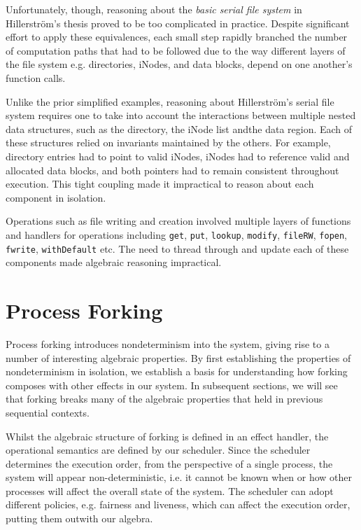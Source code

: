 \documentclass[logo,bsc,singlespacing,parskip]{infthesis}
\begin{document}
Unfortunately, though, reasoning about the \textit{basic serial file system} in Hillerström's thesis proved to be too complicated in practice. Despite significant effort to apply these equivalences, each small step  rapidly branched the number of computation paths that had to be followed due to the way different layers of the file system e.g. directories, iNodes, and data blocks, depend on one another's function calls. 

Unlike the prior simplified examples, reasoning about Hillerström's serial file system requires one to take into account the interactions between multiple nested data structures, such as the directory, the iNode list andthe data region. Each of these structures relied on invariants maintained by the others. For example, directory entries had to point to valid iNodes, iNodes had to reference valid and allocated data blocks, and both pointers had to remain consistent throughout execution. This tight coupling made it impractical to reason about each component in isolation.

Operations such as file writing and creation involved multiple layers of functions and handlers for operations including \lstinline{get}, \lstinline{put}, \lstinline{lookup}, \lstinline{modify}, \lstinline{fileRW}, \lstinline{fopen}, \lstinline{fwrite}, \lstinline{withDefault} etc. The need to thread through and update each of these components made algebraic reasoning impractical.


\section{Process Forking}

Process forking introduces nondeterminism into the system, giving rise to a number of interesting algebraic properties. By first establishing the properties of nondeterminism in isolation, we establish a basis for understanding how forking composes with other effects in our system. In subsequent sections, we will see that forking breaks many of the algebraic properties that held in previous sequential contexts.

Whilst the algebraic structure of forking is defined in an effect handler, the operational semantics are defined by our scheduler. Since the scheduler determines the execution order, from the perspective of a single process, the system will appear non-deterministic, i.e. it cannot be known when or how other processes will affect the overall state of the system. The scheduler can adopt different policies, e.g. fairness and liveness, which can affect the execution order, putting them outwith our algebra.
\end{document}
